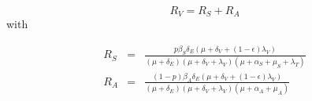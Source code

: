 \begin{equation*}
    R_{V}=R_S+R_A
\end{equation*}
with

\begin{eqnarray*}
    R_S &=& \frac{p\beta_S\delta_E(\mu+\delta_V+(1-\epsilon)                 
            \lambda_V)}{(\mu+\delta_E)(\mu+\delta_V+\lambda_V)(\mu+\alpha_S+\mu_S+\lambda_T)}
    \\ 
    R_A &=& \frac{(1-p) \beta_A \delta_E (\mu + \delta_V + (1-\epsilon)
            \lambda_V)}{(\mu+\delta_E)(\mu + \delta_V + \lambda_V)(\mu + \alpha_A + \mu_A)}
\end{eqnarray*}




